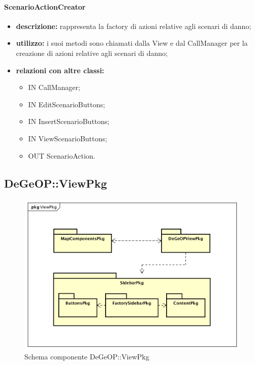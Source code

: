 \paragraph{ScenarioActionCreator}
\begin{itemize}
	\item \textbf{descrizione:} rappresenta la factory di azioni relative agli scenari di danno;
	\item \textbf{utilizzo:} i suoi metodi sono chiamati dalla View e dal CallManager per la creazione di azioni relative agli scenari di danno;
	\item \textbf{relazioni con altre classi:} 
	\begin{itemize}
		\item IN CallManager;
		\item IN EditScenarioButtons;
		\item IN InsertScenarioButtons;
		\item IN ViewScenarioButtons;
		\item OUT ScenarioAction.
	\end{itemize}
\end{itemize}
\newpage
\subsection{DeGeOP::ViewPkg}
\label{pkg::ViewPkg}
\begin{figure}[H]
	\centering
	\includegraphics[width=\textwidth]{img/PkgDiagram/ViewPkg.png}
	\caption{Schema componente DeGeOP::ViewPkg}
\end{figure}
